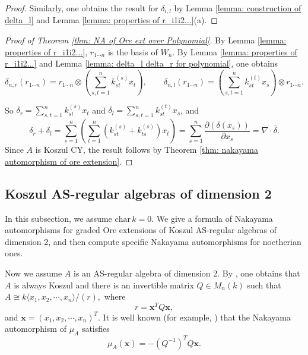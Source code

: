 \documentclass[a4paper,10pt]{amsart}
\theoremstyle{definition}
\numberwithin{equation}{section}
\begin{document}
\begin{proof}
Similarly, one obtains the result for $\delta_{i,l}$ by Lemma \ref{lemma: construction of delta_l} and Lemma \ref{lemma: properties of r_i1i2...}(a).
\end{proof}






\begin{proof}[Proof of Theorem \ref{thm: NA of Ore ext over Polynomial}]

By Lemma \ref{lemma: properties of r_i1i2...}, $r_{1\cdots n}$ is the basis of $W_n$. By Lemma \ref{lemma: properties of r_i1i2...} and Lemma \ref{lemma: delta_l delta_r for polynomial}, one obtains
$$
\delta_{n,r}(r_{1\cdots n})=r_{1\cdots n}\otimes \left(\sum^n_{s,t=1}k^{(s)}_{st} x_t\right),\qquad \delta_{n,l}(r_{1\cdots n})=\left(\sum^n_{s,t=1}k^{(t)}_{st} x_s\right)\otimes r_{1\cdots n}.
$$

So $\delta_r=\sum^n_{s,t=1}k^{(s)}_{st} x_t$ and $\delta_l=\sum^n_{s,t=1}k^{(t)}_{st} x_s$, and
$$
\delta_r+\delta_l=\sum^n_{s=1}\left( \sum^n_{t=1} (k^{(s)}_{st}+k^{(s)}_{ts})  x_t\right)
=\sum^n_{s=1} \dfrac{\partial(\delta(x_s))}{\partial x_s}=\nabla\cdot \overline{\delta}.
$$
Since $A$ is Koszul CY, the result follows by Theorem \ref{thm: nakayama automorphism of ore extension}.
\end{proof}



\subsection{Koszul AS-regular algebras of dimension 2}

In this subsection, we assume $\mathrm{char}\, k=0$. We give a formula of Nakayama automorphisms for graded Ore extensions of Koszul AS-regular algebras of dimension 2, and then compute specific Nakayama automorphisms for noetherian ones.

Now we assume $A$ is an AS-regular algebra of dimension 2. By \cite[Theorem 0.1]{Z}, one obtains that $A$ is always Koszul and there is an invertible matrix $Q\in M_n(k)$ such that
$
A\cong k\langle x_1,x_2,\cdots,x_n\rangle/(r),
$
where
$$
r=\mathbf{x}^TQ\mathbf{x},%
$$
and $\mathbf{x}=(x_1,x_2,\cdots,x_n)^T$.
It is well known (for example, \cite[Scetion 3]{HVZ}) that the Nakayama automorphism of $\mu_A$ satisfies
$$
\mu_A(\mathbf{x})
=-(Q^{-1})^TQ\mathbf{x}.
$$
\end{document}
